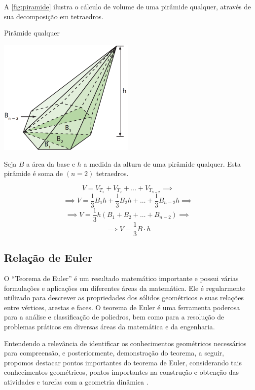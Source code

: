 A \autoref{fig:piramide} ilustra o cálculo de volume de uma pirâmide qualquer, através de sua decomposição em tetraedros.

\begin{CenteredFigure}
    \caption{Pirâmide qualquer} \label{fig:piramide}
    \includegraphics[width=0.5\textwidth]{Imagens/Novas imagens/Volume Pirâmide}
\end{CenteredFigure}


Seja $B$ a área da base e $h$ a medida da altura de uma pirâmide qualquer. Esta pirâmide é soma de $(n = 2)$ tetraedros.

$$ V = V_{T_1} + V_{T_2} + \dots + V_{T_{n-2}} \implies $$
$$ \implies V = \frac{1}{3}B_1 h + \frac{1}{3}B_2 h + \dots + \frac{1}{3}B_{n-2} h \implies $$
$$ \implies V = \frac{1}{3} h (B_1 + B_2 + \dots + B_{n-2}) \implies $$
$$ \implies V = \frac{1}{3} B \cdot h $$


\subsection{Relação de Euler}

O ``Teorema de Euler'' é um resultado matemático importante e possui várias formulações e aplicações em diferentes áreas da matemática. Ele é regularmente utilizado para descrever as propriedades dos sólidos geométricos e suas relações entre vértices, arestas e faces. O teorema de Euler é uma ferramenta poderosa para a análise e classificação de poliedros, bem como para a resolução de problemas práticos em diversas áreas da matemática e da engenharia.

\begin{citacao}
    Entendendo a relevância de identificar os conhecimentos geométricos necessários para compreensão, e posteriormente, demonstração do teorema, a seguir, propomos destacar pontos importantes do teorema de Euler, considerando tais conhecimentos geométricos, pontos importantes na construção e obtenção das atividades e tarefas com a geometria dinâmica  \cite{Pereira2022}.
\end{citacao}


